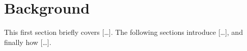 \section{Background}
\label{sec:background}

This first section briefly covers [\dots]. The following sections introduce [\dots], and finally how [\dots].









